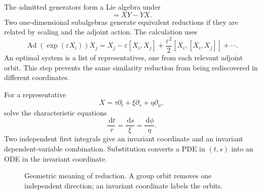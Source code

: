 \documentclass[11pt]{article}
\newcommand{\eps}{\varepsilon}
\newcommand{\dd}{\,\mathrm d}
\begin{document}
The admitted generators form a Lie algebra under
\begin{equation}
 [X,Y]=XY-YX.
\end{equation}
Two one-dimensional subalgebras generate equivalent reductions if they are related by scaling and the adjoint action.  The calculation uses
\begin{equation}
 \operatorname{Ad}(\exp(\eps X_i))X_j
 =X_j-\eps[X_i,X_j]+\frac{\eps^2}{2}[X_i,[X_i,X_j]]+\cdots.
 \label{eq:adjoint}
\end{equation}
An optimal system is a list of representatives, one from each relevant adjoint orbit.  This step prevents the same similarity reduction from being rediscovered in different coordinates.

For a representative
\begin{equation}
 X=\tau\partial_t+\xi\partial_s+\eta\partial_\phi,
\end{equation}
solve the characteristic equations
\begin{equation}
 \frac{\dd t}{\tau}=\frac{\dd s}{\xi}=\frac{\dd\phi}{\eta}.
 \label{eq:characteristic-system}
\end{equation}
Two independent first integrals give an invariant coordinate and an invariant dependent-variable combination.  Substitution converts a PDE in $(t,s)$ into an ODE in the invariant coordinate.

\begin{figure}[t]
\centering
{}
\caption{Geometric meaning of reduction.  A group orbit removes one independent direction; an invariant coordinate labels the orbits.}
\label{fig:orbits}
\end{figure}
\end{document}
